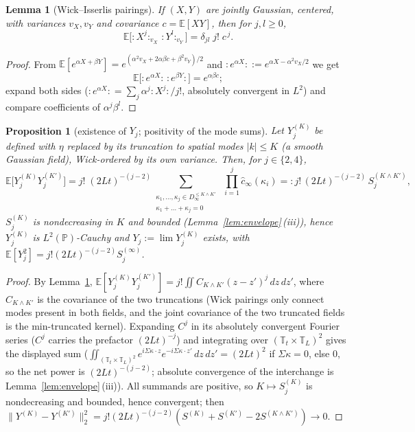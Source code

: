 \documentclass[11pt,a4paper]{article}
\theoremstyle{plain}
\newtheorem{proposition}[theorem]{Proposition}
\newtheorem{lemma}[theorem]{Lemma}
\theoremstyle{definition}
\newcommand{\T}{\mathbb{T}}
\newcommand{\E}{\mathbb{E}}
\newcommand{\PP}{\mathbb{P}}
\begin{document}
\begin{lemma}[Wick--Isserlis pairings]\label{lem:isserlis}
If $(X,Y)$ are jointly Gaussian, centered, with variances $v_X,v_Y$ and
covariance $c=\E[XY]$, then for $j,l\ge0$,
\[
 \E\bigl[{:}X^j{:}_{v_X}\,{:}Y^l{:}_{v_Y}\bigr]=\delta_{jl}\;j!\;c^{\,j}.
\]
\end{lemma}

\begin{proof}
From $\E[e^{\alpha X+\beta Y}]
=e^{(\alpha^2v_X+2\alpha\beta c+\beta^2v_Y)/2}$ and
${:}e^{\alpha X}{:}:=e^{\alpha X-\alpha^2v_X/2}$ we get
\[
 \E\bigl[{:}e^{\alpha X}{:}\,{:}e^{\beta Y}{:}\bigr]=e^{\alpha\beta c};
\]
expand both
sides (${:}e^{\alpha X}{:}=\sum_j\alpha^j{:}X^j{:}/j!$, absolutely convergent
in $L^2$) and compare coefficients of $\alpha^j\beta^l$.
\end{proof}

\begin{proposition}[existence of $Y_j$; positivity of the mode sums]
\label{prop:Yexists}
Let $Y_j^{(K)}$ be defined with $\eta$ replaced by its truncation to spatial
modes $|k|\le K$ (a smooth Gaussian field), Wick-ordered by its own variance.
Then, for $j\in\{2,4\}$,
\[
 \E\bigl[Y_j^{(K)}Y_j^{(K')}\bigr]
 =j!\;(2Lt)^{-(j-2)}
 \sum_{\substack{\kappa_1,\dots,\kappa_j\in D_\infty^{\le K\wedge K'}\\
 \kappa_1+\dots+\kappa_j=0}}\;\prod_{i=1}^j\hat c_\infty(\kappa_i)
 =:j!\,(2Lt)^{-(j-2)}\,S_j^{(K\wedge K')},
\]
$S_j^{(K)}$ is nondecreasing in $K$ and bounded
(Lemma~\ref{lem:envelope}\,(iii)), hence $Y_j^{(K)}$ is $L^2(\PP)$-Cauchy and
$Y_j:=\lim Y_j^{(K)}$ exists, with
$\E[Y_j^2]=j!(2Lt)^{-(j-2)}S_j^{(\infty)}$.
\end{proposition}

\begin{proof}
By Lemma~\ref{lem:isserlis},
$\E[Y_j^{(K)}Y_j^{(K')}]=j!\iint C_{K\wedge K'}(z-z')^j\,dz\,dz'$, where
$C_{K\wedge K'}$ is the covariance of the two truncations (Wick pairings only
connect modes present in both fields, and the joint covariance of the two
truncated fields is the min-truncated kernel). Expanding $C^j$ in its
absolutely convergent Fourier series ($C^j$ carries the prefactor
$(2Lt)^{-j}$) and integrating over $(\T_t\times\T_L)^2$ gives the displayed
sum ($\iint_{(\T_t\times\T_L)^2}
e^{i\Sigma\kappa\cdot z}e^{-i\Sigma\kappa\cdot z'}\,dz\,dz'
=(2Lt)^2$ if $\Sigma\kappa=0$, else $0$, so the net power is
$(2Lt)^{-(j-2)}$; absolute convergence of the interchange is
Lemma~\ref{lem:envelope}\,(iii)). All summands are positive, so
$K\mapsto S_j^{(K)}$ is nondecreasing and bounded, hence convergent; then
$\|Y^{(K)}-Y^{(K')}\|_2^2
=j!(2Lt)^{-(j-2)}(S^{(K)}+S^{(K')}-2S^{(K\wedge K')})\to0$.
\end{proof}
\end{document}
